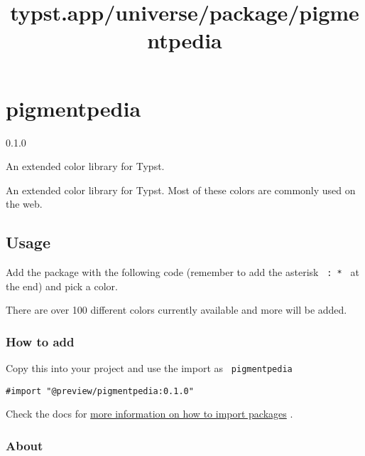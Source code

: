 \title{typst.app/universe/package/pigmentpedia}

\label{banner}
\section{pigmentpedia}\label{pigmentpedia}

{ 0.1.0 }

An extended color library for Typst.

\label{readme}
An extended color library for Typst. Most of these colors are commonly
used on the web.

\subsection{Usage}\label{usage}

Add the package with the following code (remember to add the asterisk
\texttt{\ :\ *\ } at the end) and pick a color.

\begin{Shaded}
\begin{Highlighting}[]


\end{Highlighting}
\end{Shaded}

There are over 100 different colors currently available and more will be
added.

\subsubsection{How to add}\label{how-to-add}

Copy this into your project and use the import as
\texttt{\ pigmentpedia\ }

\begin{verbatim}
#import "@preview/pigmentpedia:0.1.0"
\end{verbatim}



Check the docs for
\href{https://typst.app/docs/reference/scripting/\#packages}{more
information on how to import packages} .

\subsubsection{About}\label{about}

